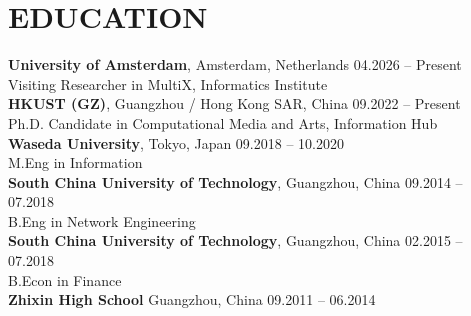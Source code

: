 \section*{EDUCATION}
\textbf{University of Amsterdam}, Amsterdam, Netherlands \hfill 04.2026 -- Present \\
Visiting Researcher in MultiX, Informatics Institute \hfill \\
\textbf{HKUST (GZ)}, Guangzhou / Hong Kong SAR, China \hfill 09.2022 -- Present\\
Ph.D. Candidate in Computational Media and Arts, Information Hub \hfill \\
\textbf{Waseda University}, Tokyo, Japan \hfill 09.2018 -- 10.2020\\ %
M.Eng in Information \hfill  \\ %
\textbf{South China University of Technology}, Guangzhou, China \hfill 09.2014 -- 07.2018\\ %
B.Eng in Network Engineering \hfill \\  %
\textbf{South China University of Technology}, Guangzhou, China \hfill 02.2015 -- 07.2018\\ %
B.Econ in Finance \hfill   \\%
\textbf{Zhixin High School} Guangzhou, China \hfill 09.2011 -- 06.2014
